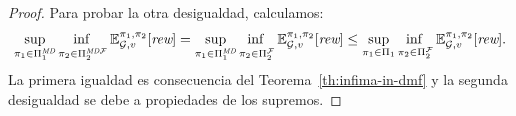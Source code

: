 \begin{proof}
Para probar la otra desigualdad, calculamos:
%
\[\adjustlimits \sup_{\strat{1} \in \DetMemorylessStrats{1}} \inf_{\strat{2} \in \DetMemorylessFairStrats{2}} \Expect{\strat{1}}{\strat{2}}_{\StochG,v}[\Rewards]
=  \adjustlimits \sup_{\strat{1} \in \DetMemorylessStrats{1}} \inf_{\strat{2} \in \FairStrats{2}} \Expect{\strat{1}}{\strat{2}}_{\StochG,v}[\Rewards]
\leq  \adjustlimits \sup_{\strat{1} \in \Strategies{1}} \inf_{\strat{2} \in \FairStrats{2}} \Expect{\strat{1}}{\strat{2}}_{\StochG,v}[\Rewards].
\]
%
  La primera igualdad es consecuencia del Teorema~\ref{th:infima-in-dmf} y la segunda desigualdad se debe a propiedades de los supremos.
\qedhere
\end{proof}





     
